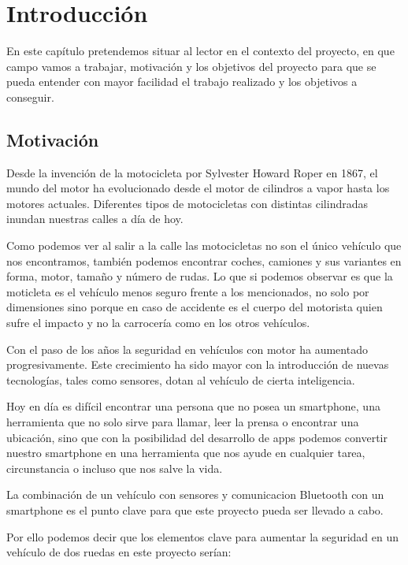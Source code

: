 \chapter{Introducci\'on}\label{cap.introduccion}
		En este cap\'itulo pretendemos situar al lector en el contexto del proyecto, en que campo vamos a trabajar, motivaci\'on y los objetivos del proyecto para que se pueda entender con mayor facilidad el trabajo realizado y los objetivos a conseguir.
		
	\section{Motivaci\'on}
		Desde la invenci\'on de la motocicleta por Sylvester Howard Roper en 1867, el mundo del motor ha evolucionado desde el motor de cilindros a vapor hasta los motores actuales. Diferentes tipos de motocicletas con distintas cilindradas inundan nuestras calles a d\'ia de hoy.
		
		Como podemos ver al salir a la calle las motocicletas no son el \'unico veh\'iculo que nos encontramos, tambi\'en podemos encontrar coches, camiones y sus variantes en forma, motor, tama\~no y n\'umero de rudas. Lo que si podemos observar es que la moticleta es el veh\'iculo menos seguro frente a los mencionados, no solo por dimensiones sino porque en caso de accidente es el cuerpo del motorista quien sufre el impacto y no la carrocer\'ia como en los otros veh\'iculos.
		
		Con el paso de los a\~nos la seguridad en veh\'iculos con motor ha aumentado progresivamente. Este crecimiento ha sido mayor con la introducci\'on de nuevas tecnolog\'ias, tales como sensores, dotan al veh\'iculo de cierta inteligencia.
		
		Hoy en d\'ia es dif\'icil encontrar una persona que no posea un smartphone, una herramienta que no solo sirve para llamar, leer la prensa o encontrar una ubicaci\'on, sino que con la posibilidad del desarrollo de apps podemos convertir nuestro smartphone en una herramienta que nos ayude en cualquier tarea, circunstancia o incluso que nos salve la vida.
		
		La combinaci\'on de un veh\'iculo con sensores y comunicacion Bluetooth con un smartphone es el punto clave para que este proyecto pueda ser llevado a cabo.
		
		Por ello podemos decir que los elementos clave para aumentar la seguridad en un veh\'iculo de dos ruedas en este proyecto ser\'ian:

